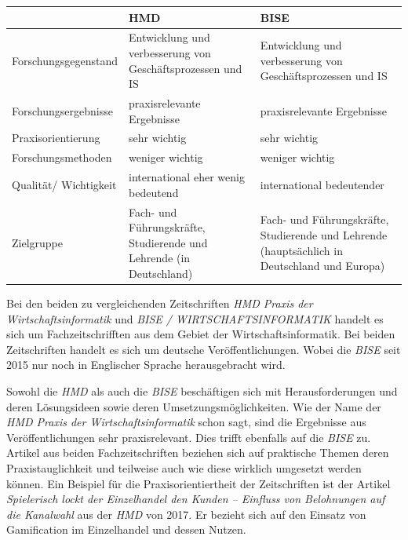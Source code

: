 \documentclass[12pt,utf8]{scrartcl}
\begin{document}
\begin{flushleft}
\begin{tabular}{|p{4cm}|p{5.5cm}|p{5.5cm}|}
\hline
& HMD & BISE \\
\hline
Forschungsgegenstand & Entwicklung und verbesserung von Geschäftsprozessen und IS & Entwicklung und verbesserung von Geschäftsprozessen und IS \\
\hline
Forschungsergebnisse & praxisrelevante Ergebnisse & praxisrelevante Ergebnisse \\
\hline
Praxisorientierung & sehr wichtig & sehr wichtig \\
\hline
Forschungsmethoden & weniger wichtig & weniger wichtig \\
\hline
Qualität/ Wichtigkeit & international eher wenig bedeutend & international bedeutender \\
\hline
Zielgruppe & Fach- und Führungskräfte, Studierende und Lehrende (in Deutschland) & Fach- und Führungskräfte, Studierende und Lehrende (hauptsächlich in Deutschland und Europa) \\
\hline
\end{tabular}
\newline
\newline
\newline

Bei den beiden zu vergleichenden Zeitschriften \emph{HMD Praxis der Wirtschaftsinformatik} und \emph{BISE / WIRTSCHAFTSINFORMATIK} handelt es sich um Fachzeitschrifften aus dem Gebiet der Wirtschaftsinformatik. Bei beiden Zeitschriften handelt es sich um deutsche Veröffentlichungen. Wobei die \emph{BISE} seit 2015 nur noch in Englischer Sprache herausgebracht wird\cite{BISE}.

Sowohl die \emph{HMD} als auch die \emph{BISE} beschäftigen sich mit Herausforderungen und deren Lösungsideen sowie deren Umsetzungsmöglichkeiten\cite{Meier2017}\cite{Stein2017}\cite{Ebert2017}. Wie der Name der \emph{HMD Praxis der Wirtschaftsinformatik} schon sagt, sind die Ergebnisse aus Veröffentlichungen sehr praxisrelevant. Dies trifft ebenfalls auf die \emph{BISE} zu. Artikel aus beiden Fachzeitschriften beziehen sich auf praktische Themen deren Praxistauglichkeit und teilweise auch wie diese wirklich umgesetzt werden können\cite{Meier2017}\cite{Stein2017}\cite{Ebert2017}\cite{Kakar2017}. Ein Beispiel für die Praxisorientiertheit der Zeitschriften ist der Artikel \emph{Spielerisch lockt der Einzelhandel den Kunden – Einfluss von Belohnungen auf die Kanalwahl}\cite{Stein2017} aus der \emph{HMD} von 2017. Er bezieht sich auf den Einsatz von Gamification im Einzelhandel und dessen Nutzen. 


\end{flushleft}
\end{document}
